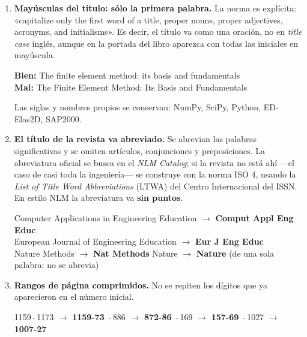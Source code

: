 \documentclass[11pt,a4paper]{article}
\newcommand{\anot}[1]{{\color{gris}\footnotesize #1}}
\begin{document}
\begin{enumerate}
\item \textbf{Mayúsculas del título: sólo la primera palabra.} La norma es explícita:
  «capitalize only the first word of a title, proper nouns, proper adjectives, acronyms, and
  initialisms». Es decir, el título va como una oración, no en \emph{title case} inglés,
  aunque en la portada del libro aparezca con todas las iniciales en mayúscula.
  \par\vspace{3pt}\hspace{1.5em}\begin{minipage}{0.9\textwidth}\small
  \textcolor{bien}{\textbf{Bien:}} The finite element method: its basis and fundamentals\\
  \textcolor{ojo}{\textbf{Mal:}} The Finite Element Method: Its Basis and Fundamentals
  \end{minipage}
  \par\vspace{3pt}
  \anot{Las siglas y nombres propios se conservan: NumPy, SciPy, Python, ED-Elas2D, SAP2000.}

\item \textbf{El título de la revista va abreviado.} Se abrevian las palabras significativas
  y se omiten artículos, conjunciones y preposiciones. La abreviatura oficial se busca en el
  \emph{NLM Catalog}; si la revista no está ahí ---el caso de casi toda la ingeniería--- se
  construye con la norma ISO 4, usando la \emph{List of Title Word Abbreviations} (LTWA) del
  Centro Internacional del ISSN. En estilo NLM la abreviatura va \textbf{sin puntos}.
  \par\vspace{3pt}\hspace{1.5em}\begin{minipage}{0.9\textwidth}\small
  Computer Applications in Engineering Education $\rightarrow$ \textbf{Comput Appl Eng Educ}\\
  European Journal of Engineering Education $\rightarrow$ \textbf{Eur J Eng Educ}\\
  Nature Methods $\rightarrow$ \textbf{Nat Methods} \quad\textbullet\quad
  Nature $\rightarrow$ \textbf{Nature} \anot{(de una sola palabra: no se abrevia)}
  \end{minipage}

\item \textbf{Rangos de página comprimidos.} No se repiten los dígitos que ya aparecieron en
  el número inicial.
  \par\vspace{3pt}\hspace{1.5em}\begin{minipage}{0.9\textwidth}\small
  1159\,-\,1173 $\rightarrow$ \textbf{1159-73} \quad\textbullet{}\,-\,886 $\rightarrow$ \textbf{872-86} \quad\textbullet{}\,-\,169 $\rightarrow$ \textbf{157-69} \quad\textbullet{}\,-\,1027 $\rightarrow$ \textbf{1007-27}
  \end{minipage}


\end{enumerate}
\end{document}
